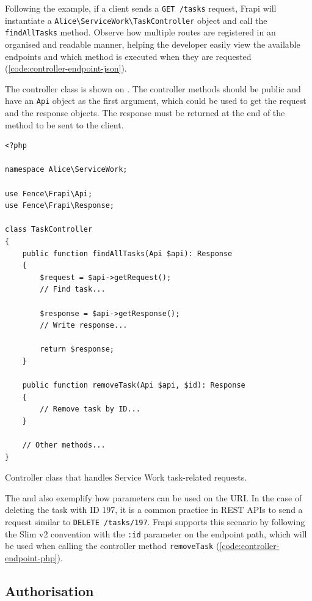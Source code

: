 Following the example, if a client sends a \texttt{GET /tasks} request, Frapi will instantiate a \texttt{Alice\textbackslash ServiceWork\textbackslash TaskController} object and call the \texttt{findAllTasks} method. Observe how multiple routes are registered in an organised and readable manner, helping the developer easily view the available endpoints and which method is executed when they are requested (\autoref{code:controller-endpoint-json}).

The controller class is shown on . The controller methods should be public and have an \texttt{Api} object as the first argument, which could be used to get the request and the response objects. The response must be returned at the end of the method to be sent to the client.

\begin{listing}[htbp]
\begin{verbatim}
<?php

namespace Alice\ServiceWork;

use Fence\Frapi\Api;
use Fence\Frapi\Response;

class TaskController
{
	public function findAllTasks(Api $api): Response
	{
		$request = $api->getRequest();
		// Find task...
		
		$response = $api->getResponse();
		// Write response...

		return $response;
	}

	public function removeTask(Api $api, $id): Response
	{
		// Remove task by ID...
	}

	// Other methods...
}
\end{verbatim}
\caption{Controller class that handles Service Work task-related requests.}
\label{code:controller-endpoint-php}
\end{listing}

The  and  also exemplify how parameters can be used on the URI. In the case of deleting the task with ID 197, it is a common practice in REST APIs to send a request similar to \texttt{DELETE /tasks/197}. Frapi supports this scenario by following the Slim v2 convention \cite{slim-v2-routing-params} with the \texttt{:id} parameter on the endpoint path, which will be used when calling the controller method \texttt{removeTask} (\autoref{code:controller-endpoint-php}).

\subsection{Authorisation}

